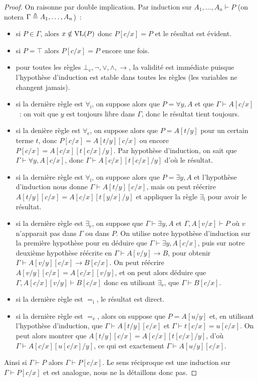 \begin{proof}
  On raisonne par double implication. Par induction sur
  $A_1,\ldots,A_n\vdash P$ (on notera $\Gamma \triangleq A_1,\ldots,A_n$)~:
  \begin{itemize}
  \item si $P\in \Gamma$, alors $x\notin\operatorname{VL}(P)$ donc $P[c/x]=P$ et
    le résultat est évident.
  \item si $P = \top$ alors $P[c/x]=P$ encore une fois.
  \item pour toutes les règles $\bot_\mathrm c,\lnot,\lor,\land,\to$, la
    validité est immédiate puisque l'hypothèse d'induction est stable dans
    toutes les règles (les variables ne changent jamais).
  \item si la dernière règle est $\forall_\mathrm i$, on suppose alors que
    $P = \forall y, A$ et que $\Gamma\vdash A[c/x]$~: on voit que $y$ est
    toujours libre dans $\Gamma$, donc le résultat tient toujours.
  \item si la denière règle est $\forall_\mathrm e$, on suppose alors que
    $P = A[t/y]$ pour un certain terme $t$, donc $P[c/x] = A[t/y][c/x]$ ou
    encore $P[c/x] = A[c/x][t[c/x]/y]$. Par hypothèse d'induction, on sait que
    $\Gamma\vdash \forall y, A[c/x]$, donc $\Gamma\vdash A[c/x][t[c/x]/y]$
    d'où le résultat.
  \item si la dernière règle est $\forall_\mathrm i$, on suppose alors que
    $P = \exists y, A$ et l'hypothèse d'induction nous donne
    $\Gamma\vdash A[t/y][c/x]$, mais on peut réécrire
    $A[t/y][c/x] = A[c/x][t[y/x]/y]$ et appliquer la règle $\exists_\mathrm i$
    pour avoir le résultat.
  \item si la dernière règle est $\exists_\mathrm e$, on suppose que
    $\Gamma\vdash \exists y, A$ et $\Gamma, A[v/x]\vdash P$ où $v$ n'apparait
    pas dans $\Gamma$ ou dans $P$. On utilise notre hypothèse d'induction sur
    la première hypothèse pour en déduire que $\Gamma\vdash \exists y, A[c/x]$,
    puis sur notre deuxième hypothèse réécrite en $\Gamma\vdash A[v/y]\to B$,
    pour obtenir $\Gamma\vdash A[v/y][c/x]\to B[c/x]$. On peut réécrire
    $A[v/y][c/x] = A[c/x][v/y]$, et on peut alors déduire que
    $\Gamma,A[c/x][v/y]\vdash B[c/x]$ donc en utilisant $\exists_\mathrm e$, que
    $\Gamma\vdash B[c/x]$.
  \item si la dernière règle est $=_\mathrm i$, le résultat est direct.
  \item si la dernière règle est $=_\mathrm e$, alors on suppose que $P = A[u/y]$
    et, en utilisant l'hypothèse d'induction, que $\Gamma\vdash A[t/y][c/x]$
    et $\Gamma\vdash t[c/x] = u[c/x]$. On peut alors montrer que
    $A[t/y][c/x] = A[c/x][t[c/x]/y]$, d'où $\Gamma\vdash A[c/x][u[c/x]/y]$, ce
    qui est exactement $\Gamma\vdash A[u/y][c/x]$.
  \end{itemize}
  Ainsi si $\Gamma\vdash P$ alors $\Gamma\vdash P[c/x]$. Le sens réciproque est
  une induction sur $\Gamma\vdash P[c/x]$ et est analogue, nous ne la détaillons
  donc pas.
\end{proof}


